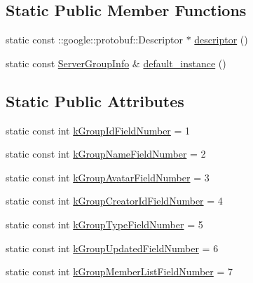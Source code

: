 \subsection*{Static Public Member Functions}
\begin{DoxyCompactItemize}
\item 
static const \+::google\+::protobuf\+::\+Descriptor $\ast$ \hyperlink{class_i_m_1_1_base_define_1_1_server_group_info_aa406a9da21d98f1d611a6e99c3ab60cc}{descriptor} ()
\item 
static const \hyperlink{class_i_m_1_1_base_define_1_1_server_group_info}{Server\+Group\+Info} \& \hyperlink{class_i_m_1_1_base_define_1_1_server_group_info_a5581f14d149abaa18f981ec50c0e0e0b}{default\+\_\+instance} ()
\end{DoxyCompactItemize}
\subsection*{Static Public Attributes}
\begin{DoxyCompactItemize}
\item 
static const int \hyperlink{class_i_m_1_1_base_define_1_1_server_group_info_a657ac34149a9b93db083dac9a029b8ff}{k\+Group\+Id\+Field\+Number} = 1
\item 
static const int \hyperlink{class_i_m_1_1_base_define_1_1_server_group_info_a87b5cefd449e7b3fcfb587315e02dd22}{k\+Group\+Name\+Field\+Number} = 2
\item 
static const int \hyperlink{class_i_m_1_1_base_define_1_1_server_group_info_a88a15caebda5a75e5c5067e9eb6e10b8}{k\+Group\+Avatar\+Field\+Number} = 3
\item 
static const int \hyperlink{class_i_m_1_1_base_define_1_1_server_group_info_a0a6baf8c9ad74be7131d3bbc17f99d10}{k\+Group\+Creator\+Id\+Field\+Number} = 4
\item 
static const int \hyperlink{class_i_m_1_1_base_define_1_1_server_group_info_a70d58cd560e2440a51d761cb2ba2518a}{k\+Group\+Type\+Field\+Number} = 5
\item 
static const int \hyperlink{class_i_m_1_1_base_define_1_1_server_group_info_a06c82fd70e4af6b87625fdb55475b47d}{k\+Group\+Updated\+Field\+Number} = 6
\item 
static const int \hyperlink{class_i_m_1_1_base_define_1_1_server_group_info_a32341d4f66d3212501c8c76aadbfb6de}{k\+Group\+Member\+List\+Field\+Number} = 7
\end{DoxyCompactItemize}
